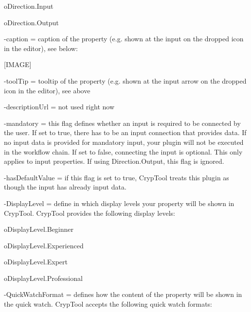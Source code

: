 \hspace{30pt}o\hspace{10pt}Direction.Input

\hspace{30pt}o\hspace{10pt}Direction.Output

\hspace{20pt}-caption = caption of the property (e.g. shown at the input on the dropped icon in the editor), see below:

[IMAGE]

\hspace{20pt}-toolTip = tooltip of the property (e.g. shown at the input arrow on the dropped icon in the editor), see above

\hspace{20pt}-descriptionUrl = not used right now

\hspace{20pt}-mandatory = this flag defines whether an input is required to be connected by the user. If set to true, there has to be an input connection that provides data. If no input data is provided for mandatory input, your plugin will not be executed in the workflow chain. If set to false, connecting the input is optional. This only applies to input properties. If using Direction.Output, this flag is ignored.

\hspace{20pt}-hasDefaultValue = if this flag is set to true, CrypTool treats this plugin as though the input has already input data.

\hspace{20pt}-DisplayLevel = define in which display levels your property will be shown in CrypTool. CrypTool provides the following display levels:

\hspace{30pt}o\hspace{10pt}DisplayLevel.Beginner

\hspace{30pt}o\hspace{10pt}DisplayLevel.Experienced

\hspace{30pt}o\hspace{10pt}DisplayLevel.Expert

\hspace{30pt}o\hspace{10pt}DisplayLevel.Professional

\hspace{20pt}-QuickWatchFormat = defines how the content of the property will be shown in the quick watch. CrypTool accepts the following quick watch formats:


